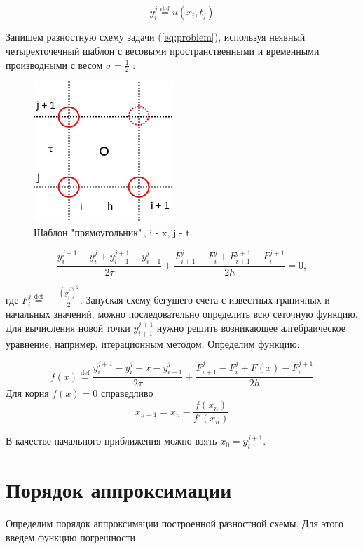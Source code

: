 \documentclass[12pt]{article}
\begin{document}
		$$y_i^j \overset{\mathrm{def}}{=} u(x_i, t_j)$$
		
		Запишем разностную схему задачи (\ref{eq:problem}), используя неявный четырехточечный шаблон с весовыми пространственными и временными производными с весом $\sigma = \frac{1}{2}$ :
		
		\begin{figure}[h!]
			\begin{center}
				\includegraphics[width=0.5\linewidth]{template}
				\caption{Шаблон "прямоугольник"\,, i - x, j - t}
			\end{center}
		\end{figure}
		
		\begin{equation}
			\frac{y^{j+1}_i - y^j_i + y^{j+1}_{i+1} - y^j_{i+1}}{2\tau} + \frac{F^j_{i+1} - F^j_i + F^{j+1}_{i+1} - F^{j+1}_i}{2h} = 0,
		\end{equation}
		
		где $F^j_i \overset{\mathrm{def}}{=} -\frac{(y^j_i)^2}{2}$. Запуская схему бегущего счета с известных граничных и начальных значений, можно последовательно определить всю сеточную функцию. Для вычисления новой точки $y^{j+1}_{i+1}$ нужно решить возникающее алгебраическое уравнение, например, итерационным методом. Определим функцию:
		
		$$ f(x) \overset{\mathrm{def}}{=} \frac{y^{j+1}_i - y^j_i + x - y^j_{i+1}}{2\tau} + \frac{F^j_{i+1} - F^j_i + F(x) - F^{j+1}_i}{2h}$$
		Для корня $f(x) = 0$ справедливо
		$$x_{n+1} = x_n - \frac{f(x_n)}{f'(x_n)}$$
		
		В качестве начального приближения можно взять $x_0 = y_i^{j+1}$.
		
	\section{Порядок аппроксимации}
		Определим порядок аппроксимации построенной разностной схемы. Для этого введем функцию погрешности
		
\end{document}

